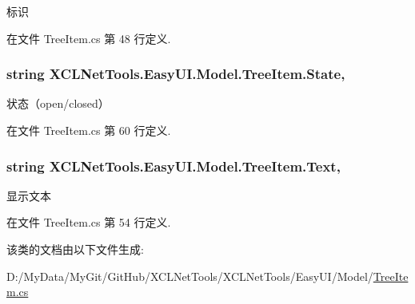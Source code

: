 标识 



在文件 Tree\-Item.\-cs 第 48 行定义.

\hypertarget{class_x_c_l_net_tools_1_1_easy_u_i_1_1_model_1_1_tree_item_a3b664ea234076c4f0ca6e550c5f7b106}{
\subsubsection[{State}]{\setlength{\rightskip}{0pt plus 5cm}string X\-C\-L\-Net\-Tools.\-Easy\-U\-I.\-Model.\-Tree\-Item.\-State\hspace{0.3cm}{\ttfamily [get]}, {\ttfamily [set]}}}\label{class_x_c_l_net_tools_1_1_easy_u_i_1_1_model_1_1_tree_item_a3b664ea234076c4f0ca6e550c5f7b106}


状态（open/closed） 



在文件 Tree\-Item.\-cs 第 60 行定义.

\hypertarget{class_x_c_l_net_tools_1_1_easy_u_i_1_1_model_1_1_tree_item_a02915b13c54f2f0980e9888209da0a17}{
\subsubsection[{Text}]{\setlength{\rightskip}{0pt plus 5cm}string X\-C\-L\-Net\-Tools.\-Easy\-U\-I.\-Model.\-Tree\-Item.\-Text\hspace{0.3cm}{\ttfamily [get]}, {\ttfamily [set]}}}\label{class_x_c_l_net_tools_1_1_easy_u_i_1_1_model_1_1_tree_item_a02915b13c54f2f0980e9888209da0a17}


显示文本 



在文件 Tree\-Item.\-cs 第 54 行定义.



该类的文档由以下文件生成\-:\begin{DoxyCompactItemize}
\item 
D\-:/\-My\-Data/\-My\-Git/\-Git\-Hub/\-X\-C\-L\-Net\-Tools/\-X\-C\-L\-Net\-Tools/\-Easy\-U\-I/\-Model/\hyperlink{_tree_item_8cs}{Tree\-Item.\-cs}\end{DoxyCompactItemize}
